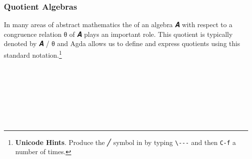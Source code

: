 \subsubsection*{Quotient Algebras} %
In many areas of abstract mathematics the  of an algebra \ab 𝑨 with respect to a congruence relation \ab θ of \ab 𝑨 plays an important role. This quotient is typically denoted by \ab 𝑨 \af / \ab θ and Agda allows us to define and express quotients using this standard notation.\footnote{%
\textbf{Unicode Hints}. Produce the ╱ symbol in \agdamode by typing \texttt{\textbackslash{}-\/-\/-} and then \texttt{C-f} a number of times.}
\ccpad
\begin{code}%
\>[0]\AgdaSpace{}%
\AgdaModule{\AgdaUnderscore{}}\AgdaSpace{}%
\AgdaSymbol{\{}\AgdaSpace{}%
\AgdaSpace{}%
\AgdaSymbol{:}\AgdaSpace{}%
\AgdaSymbol{\}}\AgdaSpace{}%
\<%
\\
%
\\[\AgdaEmptyExtraSkip]%
\>[0][@{}l@{\AgdaIndent{0}}]%
\>[1]\AgdaSpace{}%
\AgdaSymbol{:}\AgdaSpace{}%
\AgdaSymbol{(}\AgdaSpace{}%
\AgdaSymbol{:}\AgdaSpace{}%
\AgdaSpace{}%
\AgdaSpace{}%
\AgdaSymbol{)}\AgdaSpace{}%
\AgdaSpace{}%
\AgdaSymbol{\{}\AgdaSymbol{\}}\AgdaSpace{}%
\AgdaSpace{}%
\AgdaSpace{}%
\AgdaSpace{}%
\AgdaSymbol{(}\AgdaSpace{}%
\AgdaSpace{}%
\AgdaSpace{}%
\AgdaSymbol{)}\AgdaSpace{}%
\<%
\\
%
\\[\AgdaEmptyExtraSkip]%
%
\>[1]\AgdaSpace{}%
\AgdaSpace{}%
\AgdaSpace{}%
\AgdaSymbol{=}%
\>[277I]\AgdaSymbol{(}\AgdaSpace{}%
\AgdaSpace{}%
\AgdaSpace{}%
\AgdaOperator{\AgdaFunction{/}}\AgdaSpace{}%
\AgdaSpace{}%
\AgdaSpace{}%
\AgdaSymbol{)}%
\>[26]\AgdaOperator{\AgdaInductiveConstructor{,}}%
\>[58]\<%
\\
%
\\[\AgdaEmptyExtraSkip]%
\>[.][@{}l@{}]\<[277I]%
\>[9]\AgdaSpace{}%
\AgdaSpace{}%
\AgdaSpace{}%
\AgdaSpace{}%
\AgdaSpace{}%
\AgdaSymbol{(}\AgdaSpace{}%
\AgdaSpace{}%
\AgdaSpace{}%
\AgdaSpace{}%
%
\>[34]\AgdaSpace{}%
\AgdaSpace{}%
\AgdaSpace{}%
\AgdaSpace{}%
\AgdaSymbol{)}\AgdaSpace{}%
%
\>[59]\<%
\end{code}
